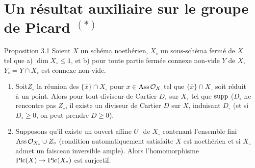 \documentclass[10pt]{../fichiers-configuration-latex/smfart}
\begin{document}
\section{Un résultat auxiliaire sur le groupe de Picard ${}^{(*)}$}

\begin{enonce*}{Proposition 3.1}
Soient $X$ un schéma noethérien, $X_{\circ}$ un sous-schéma fermé de
$X$ tel que {\rm a)} $\dim X_{\circ}\leq 1$, et {\rm b)} pour toute
partie fermée connexe non-vide $Y$ de $X$, $Y_{\circ}=Y\cap X_{\circ}$
est connexe non-vide.
\begin{enumerate}
\renewcommand{\theenumi}{\roman{enumi}}
\renewcommand{\labelenumi}{(\theenumi)}
\item Soit\pageoriginale $Z_{\circ}$ la réunion des $\{\bar{x}\}\cap
X_{\circ}$ pour $x\in \operatorname{Ass} {\mathcal O}_X$ tel que $\{\bar{x}\}\cap X_{\circ}$
soit réduit à un point. Alors pour tout diviseur de Cartier
$D_{\circ}$ sur $X_{\circ}$ tel que $\operatorname{supp}$ ($D_{\circ}$ ne rencontre
pas $Z_{\circ}$, il existe un diviseur de Cartier $D$ sur $X$,
induisant $D_{\circ}$ (et si $D_{\circ}\geq 0$, on peut prendre $D\geq
0$).

\item Supposons qu'il existe un ouvert affine $U_{\circ}$ de
$X_{\circ}$ contenant l'ensemble fini $\operatorname{Ass} {\mathcal O}_{X_{\circ}}\cup
Z_{\circ}$ (condition automatiquement satisfaite $X$ est noethérien et
si $X_{\circ}$ admet un faisceau inversible ample). Alors
l'homomorphisme $\operatorname{Pic}(X)\rightarrow \operatorname{Pic}(X_{\circ})$ est surjectif.
\end{enumerate}
\end{enonce*}
\end{document}
